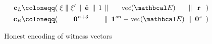 \begin{figure}[h!]
  \begin{align*}
    \textbf{c}_{L} 
      &\coloneqq 
      (\hspace{1mm}\xi\hspace{1mm} \|
      \hspace{1mm}\xi^{\prime}\hspace{1mm}\|
      \hspace{1.7mm} \hat{\textbf{e}} \hspace{1.7mm}  \|
      \hspace{1.4mm}1 \hspace{1.4mm} \|
      \hspace{6.5mm}
      \textsl{vec}(\Emat)
      \hspace{6.5mm} \|
      \hspace{2.6mm}\textbf{r}\hspace{2.6mm}) \\
      \textbf{c}_{R} &\coloneqq (
      \hspace{7.9mm} 
      \vecnb{0}^{n+3} 
      \hspace{7.9mm} \| 
      \hspace{1.65mm}
      \vecnb{1}^{s n} - \textsl{vec}(\Emat) 
      \hspace{1.65mm}\|
      \hspace{1.8mm}
      \vecnb{0}^{s}
      \hspace{1.8mm})
  \end{align*}
  \caption{Honest encoding of witness vectors}
  \label{fig:witness}
\end{figure}

